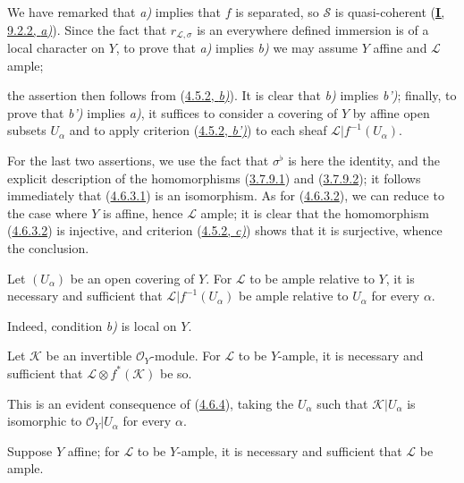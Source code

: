 We have remarked that \emph{a)} implies that $f$ is separated, so $\mathcal{S}$ is
quasi-coherent (\hyperref[I.9.2.2]{\textbf{I}, 9.2.2, \emph{a)}}). Since the fact that
$r_{\mathcal{L},\sigma}$ is an everywhere defined immersion is of a
local character on $Y$, to prove that \emph{a)} implies \emph{b)} we may assume
$Y$ affine and $\mathcal{L}$ ample;


the assertion then follows from (\hyperref[II.4.5.2]{4.5.2, \emph{b)}}). It is
clear that \emph{b)} implies \emph{b')}; finally, to prove that \emph{b')} implies \emph{a)}, it
suffices to consider a covering of $Y$ by affine open subsets
$U_\alpha$ and to apply criterion
(\hyperref[II.4.5.2]{4.5.2, \emph{b')}}) to each sheaf
$\mathcal{L}|f^{-1}(U_\alpha)$.

For the last two assertions, we use the fact that
$\sigma^\flat$ is here the identity, and the explicit description of the homomorphisms
(\hyperref[II.3.7.9.1]{3.7.9.1}) and
(\hyperref[II.3.7.9.2]{3.7.9.2}); it follows immediately that
(\hyperref[II.4.6.3.1]{4.6.3.1}) is an isomorphism. As for
(\hyperref[II.4.6.3.2]{4.6.3.2}), we can reduce to the case where $Y$ is
affine, hence $\mathcal{L}$ ample; it is clear that the homomorphism
(\hyperref[II.4.6.3.2]{4.6.3.2}) is injective, and criterion
(\hyperref[II.4.5.2]{4.5.2, \emph{c)}}) shows that it is surjective, whence the
conclusion.

\begin{corollary}[4.6.4]
\label{II.4.6.4}
Let $(U_\alpha)$ be an open covering of $Y$. For $\mathcal{L}$
to be ample relative to $Y$, it is necessary and sufficient that
$\mathcal{L}|f^{-1}(U_\alpha)$ be ample relative to $U_\alpha$ for
every $\alpha$.
\end{corollary}

Indeed, condition \emph{b)} is local on $Y$.

\begin{corollary}[4.6.5]
\label{II.4.6.5}
Let $\mathcal{K}$ be an invertible $\mathcal{O}_Y$-module. For
$\mathcal{L}$ to be $Y$-ample, it is necessary and sufficient that
$\mathcal{L}\otimes f^*(\mathcal{K})$ be so.
\end{corollary}

This is an evident consequence of (\hyperref[II.4.6.4]{4.6.4}),
taking the $U_\alpha$ such that $\mathcal{K}|U_\alpha$ is isomorphic to
$\mathcal{O}_Y|U_\alpha$ for every $\alpha$.

\begin{corollary}[4.6.6]
\label{II.4.6.6}
Suppose $Y$ affine; for $\mathcal{L}$ to be $Y$-ample, it is necessary and
sufficient that $\mathcal{L}$ be ample.
\end{corollary}

